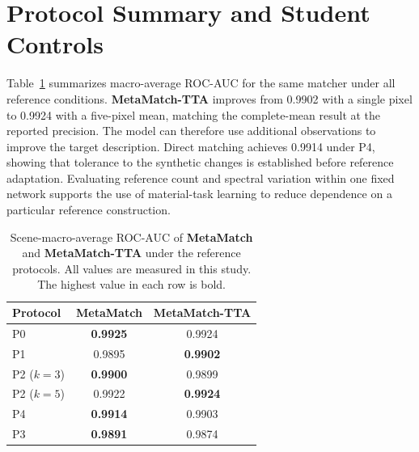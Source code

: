 \documentclass[a4paper,11pt]{article}
\renewcommand{\arraystretch}{1.18}
\newcommand{\method}{\textbf{MetaMatch-TTA}}
\newcommand{\matcher}{\textbf{MetaMatch}}
\begin{document}
\section{Protocol Summary and Student Controls}\label{supp:student}
Table~\ref{tab:protocols} summarizes macro-average ROC-AUC for the same matcher under all reference conditions. \method{} improves from 0.9902 with a single pixel to 0.9924 with a five-pixel mean, matching the complete-mean result at the reported precision. The model can therefore use additional observations to improve the target description. Direct matching achieves 0.9914 under P4, showing that tolerance to the synthetic changes is established before reference adaptation. Evaluating reference count and spectral variation within one fixed network supports the use of material-task learning to reduce dependence on a particular reference construction.
\begin{table}[H]\centering\footnotesize\setlength{\tabcolsep}{4pt}\renewcommand{\arraystretch}{1.14}
\caption{Scene-macro-average ROC-AUC of \matcher{} and \method{} under the reference protocols. All values are measured in this study. The highest value in each row is bold.}\label{tab:protocols}
\begin{lrbox}{\fulltablebox}\begin{tabular}{lcc}\toprule
Protocol & \textbf{\matcher{}} & \textbf{\method{}} \\ \midrule
P0 & \textbf{0.9925} & 0.9924 \\
P1 & 0.9895 & \textbf{0.9902} \\
P2 ($k=3$) & \textbf{0.9900} & 0.9899 \\
P2 ($k=5$) & 0.9922 & \textbf{0.9924} \\
P4 & \textbf{0.9914} & 0.9903 \\
P3 & \textbf{0.9891} & 0.9874 \\
\bottomrule\end{tabular}\end{lrbox}\ifdim\wd\fulltablebox>\linewidth\resizebox{\linewidth}{!}{\usebox{\fulltablebox}}\else\usebox{\fulltablebox}\fi\end{table}
\end{document}
